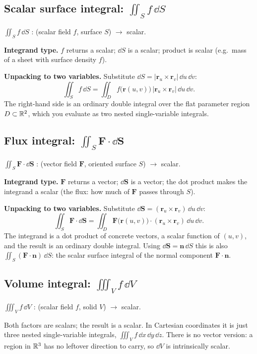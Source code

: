 \documentclass{essay}
\newcommand{\F}{\mathbf{F}}
\newcommand{\rr}{\mathbf{r}}
\newcommand{\nn}{\mathbf{n}}
\begin{document}
\subsection{Scalar surface integral: $\iint_S f\,\dd S$}

\begin{signature}
  $\displaystyle \iint_S f\,\dd S$ \;:\; (scalar field $f$, surface $S$) $\to$ scalar.
\end{signature}

\textbf{Integrand type.} $f$ returns a scalar; $\dd S$ is a scalar; product is
scalar (e.g.\ mass of a sheet with surface density $f$).

\textbf{Unpacking to two variables.} Substitute
$\dd S = \lvert\rr_u\times\rr_v\rvert\,\dd u\,\dd v$:
\[
  \iint_S f\,\dd S
  = \iint_D f\bigl(\rr(u,v)\bigr)\,\lvert\rr_u\times\rr_v\rvert\,\dd u\,\dd v .
\]
The right-hand side is an ordinary double integral over the flat parameter region
$D\subset\mathbb{R}^2$, which you evaluate as two nested single-variable integrals.

\subsection{Flux integral: $\iint_S \F\cdot\dd\mathbf{S}$}

\begin{signature}
  $\displaystyle \iint_S \F\cdot\dd\mathbf{S}$ \;:\; (vector field $\F$, oriented
  surface $S$) $\to$ scalar.
\end{signature}

\textbf{Integrand type.} $\F$ returns a vector; $\dd\mathbf{S}$ is a vector; the dot
product makes the integrand a scalar (the flux: how much of $\F$ passes through $S$).

\textbf{Unpacking to two variables.} Substitute
$\dd\mathbf{S}=(\rr_u\times\rr_v)\,\dd u\,\dd v$:
\[
  \iint_S \F\cdot\dd\mathbf{S}
  = \iint_D \F\bigl(\rr(u,v)\bigr)\cdot(\rr_u\times\rr_v)\,\dd u\,\dd v .
\]
The integrand is a dot product of concrete vectors, a scalar function of $(u,v)$, and
the result is an ordinary double integral. Using $\dd\mathbf{S}=\nn\,\dd S$ this is
also $\iint_S(\F\cdot\nn)\,\dd S$: the scalar surface integral of the normal
component $\F\cdot\nn$.

\subsection{Volume integral: $\iiint_V f\,\dd V$}

\begin{signature}
  $\displaystyle \iiint_V f\,\dd V$ \;:\; (scalar field $f$, solid $V$) $\to$ scalar.
\end{signature}
Both factors are scalars; the result is a scalar. In Cartesian coordinates it is just
three nested single-variable integrals,
$\iiint_V f\,\dd x\,\dd y\,\dd z$. There is no vector version: a region in $\mathbb{R}^3$ has
no leftover direction to carry, so $\dd V$ is intrinsically scalar.
\end{document}
